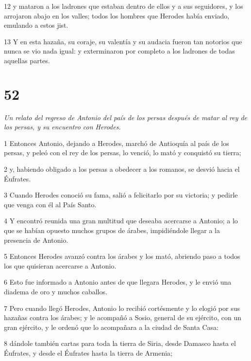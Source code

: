 \par 12 y mataron a los ladrones que estaban dentro de ellos y a sus seguidores, y los arrojaron abajo en los valles; todos los hombres que Herodes había enviado, emulando a estos jist.

\par 13 Y en esta hazaña, su coraje, su valentía y su audacia fueron tan notorios que nunca se vio nada igual: y exterminaron por completo a los ladrones de todas aquellas partes.

\chapter{52}

\par \textit{Un relato del regreso de Antonio del país de los persas después de matar al rey de los persas, y su encuentro con Herodes.}

\par 1 Entonces Antonio, dejando a Herodes, marchó de Antioquía al país de los persas, y peleó con el rey de los persas, lo venció, lo mató y conquistó su tierra;

\par 2 y, habiendo obligado a los persas a obedecer a los romanos, se desvió hacia el Éufrates.

\par 3 Cuando Herodes conoció su fama, salió a felicitarlo por su victoria; y pedirle que venga con él al País Santo.

\par 4 Y encontró reunida una gran multitud que deseaba acercarse a Antonio; a lo que se habían opuesto muchos grupos de árabes, impidiéndole llegar a la presencia de Antonio.

\par 5 Entonces Herodes avanzó contra los árabes y los mató, abriendo paso a todos los que quisieran acercarse a Antonio.

\par 6 Esto fue informado a Antonio antes de que llegara Herodes, y le envió una diadema de oro y muchos caballos.

\par 7 Pero cuando llegó Herodes, Antonio lo recibió cortésmente y lo elogió por sus hazañas contra los árabes; y le acompañó a Sosio, general de su ejército, con un gran ejército, y le ordenó que lo acompañara a la ciudad de Santa Casa:

\par 8 dándole también cartas para toda la tierra de Siria, desde Damasco hasta el Éufrates, y desde el Éufrates hasta la tierra de Armenia;

